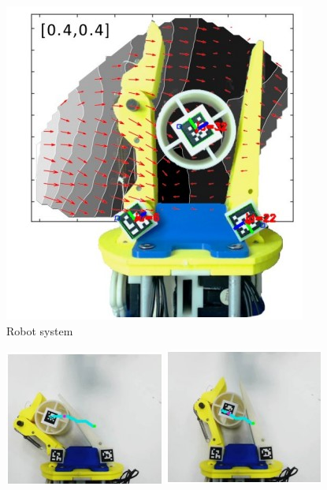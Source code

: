 \documentclass[a4paper,twoside,12pt,papersize, dvipdfmx]{iirthesis}
\begin{document}
\begin{figure}[b]
	\centering
	\includegraphics[width=0.3\hsize]{fig/1-introduction/bircher/handsystem.jpg}
	\caption{Robot system \cite{bircher2019}}
	\label{fig::system}
\end{figure}
\begin{figure}[b]
\centering
\begin{minipage}{0.24\hsize}
\centering
\includegraphics[width=\hsize]{fig/1-introduction/bircher/mani_a.jpg}
\subcaption{}
\end{minipage}
\begin{minipage}{0.24\hsize}
\centering
\includegraphics[width=\hsize]{fig/1-introduction/bircher/mani_b.jpg}

\end{minipage}
\end{figure}
\end{document}
